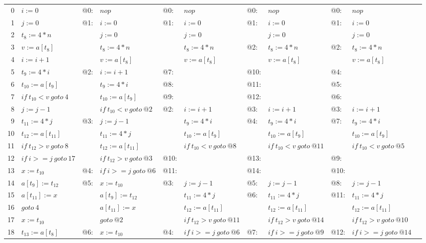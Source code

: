 \begin{scriptsize}
\begin{tabular}{rllllllllll}
0 & $i:=0$ & @0: & $nop$ & @0: & $nop$ & @0: & $nop$ & @0: & $nop$ & \\
1 & $j:=0$ & @1: & $i:=0$ & @1: & $i:=0$ & @1: & $i:=0$ & @1: & $i:=0$ & \\
2 & $t_{8}:=4*n$ &  & $j:=0$ &  & $j:=0$ &  & $j:=0$ &  & $j:=0$ & \\
3 & $v:=a[t_{8}]$ &  & $t_{8}:=4*n$ &  & $t_{8}:=4*n$ & @2: & $t_{8}:=4*n$ & @2: & $t_{8}:=4*n$ & \\
4 & $i:=i+1$ &  & $v:=a[t_{8}]$ &  & $v:=a[t_{8}]$ &  & $v:=a[t_{8}]$ &  & $v:=a[t_{8}]$ & \\
5 & $t_{9}:=4*i$ & @2: & $i:=i+1$ & @7: & & @10: & & @4: & & \\
6 & $t_{10}:=a[t_{9}]$ &  & $t_{9}:=4*i$ & @8: & & @11: & & @5: & & \\
7 & $if\:t_{10}<v\:goto\:4$ &  & $t_{10}:=a[t_{9}]$ & @9: & & @12: & & @6: & & \\
8 & $j:=j-1$ &  & $if\:t_{10}<v\:goto\:@2$ & @2: & $i:=i+1$ & @3: & $i:=i+1$ & @3: & $i:=i+1$ & \\
9 & $t_{11}:=4*j$ & @3: & $j:=j-1$ &  & $t_{9}:=4*i$ & @4: & $t_{9}:=4*i$ & @7: & $t_{9}:=4*i$ & \\
10 & $t_{12}:=a[t_{11}]$ &  & $t_{11}:=4*j$ &  & $t_{10}:=a[t_{9}]$ &  & $t_{10}:=a[t_{9}]$ &  & $t_{10}:=a[t_{9}]$ & \\
11 & $if\:t_{12}>v\:goto\:8$ &  & $t_{12}:=a[t_{11}]$ &  & $if\:t_{10}<v\:goto\:@8$ &  & $if\:t_{10}<v\:goto\:@11$ &  & $if\:t_{10}<v\:goto\:@5$ & \\
12 & $if\:i>=j\:goto\:17$ &  & $if\:t_{12}>v\:goto\:@3$ & @10: & & @13: & & @9: & & \\
13 & $x:=t_{10}$ & @4: & $if\:i>=j\:goto\:@6$ & @11: & & @14: & & @10: & & \\
14 & $a[t_{9}]:=t_{12}$ & @5: & $x:=t_{10}$ & @3: & $j:=j-1$ & @5: & $j:=j-1$ & @8: & $j:=j-1$ & \\
15 & $a[t_{11}]:=x$ &  & $a[t_{9}]:=t_{12}$ &  & $t_{11}:=4*j$ & @6: & $t_{11}:=4*j$ & @11: & $t_{11}:=4*j$ & \\
16 & $goto\:4$ &  & $a[t_{11}]:=x$ &  & $t_{12}:=a[t_{11}]$ &  & $t_{12}:=a[t_{11}]$ &  & $t_{12}:=a[t_{11}]$ & \\
17 & $x:=t_{10}$ &  & $goto\:@2$ &  & $if\:t_{12}>v\:goto\:@11$ &  & $if\:t_{12}>v\:goto\:@14$ &  & $if\:t_{12}>v\:goto\:@10$ & \\
18 & $t_{13}:=a[t_{8}]$ & @6: & $x:=t_{10}$ & @4: & $if\:i>=j\:goto\:@6$ & @7: & $if\:i>=j\:goto\:@9$ & @12: & $if\:i>=j\:goto\:@14$ & \\

\end{tabular}
\end{scriptsize}
